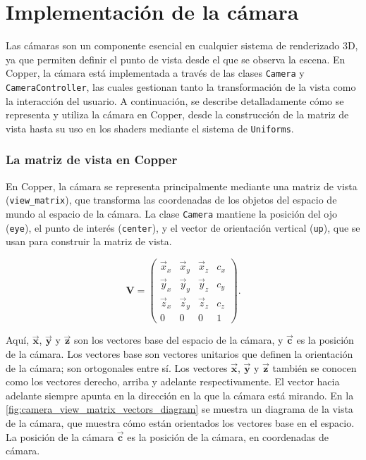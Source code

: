 \chapter{Implementación de la cámara}

Las cámaras son un componente esencial en cualquier sistema de renderizado 3D,
ya que permiten definir el punto de vista desde el que se observa la escena. En
Copper, la cámara está implementada a través de las clases \texttt{Camera} y
\texttt{CameraController}, las cuales gestionan tanto la transformación de la
vista como la interacción del usuario. A continuación, se describe
detalladamente cómo se representa y utiliza la cámara en Copper, desde la
construcción de la matriz de vista hasta su uso en los shaders mediante el
sistema de \texttt{Uniforms}.

\subsection{La matriz de vista en Copper}

En Copper, la cámara se representa principalmente mediante una matriz de vista
(\texttt{view\_matrix}), que transforma las coordenadas de los objetos del
espacio de mundo al espacio de la cámara. La clase \texttt{Camera} mantiene la
posición del ojo (\texttt{eye}), el punto de interés (\texttt{center}), y el
vector de orientación vertical (\texttt{up}), que se usan para construir la
matriz de vista.

\begin{equation}
    \bm{V}
    =
    \begin{pmatrix}
        \vec{x}_x & \vec{x}_y & \vec{x}_z & c_x
        \\
        \vec{y}_x & \vec{y}_y & \vec{y}_z & c_y
        \\
        \vec{z}_x & \vec{z}_y & \vec{z}_z & c_z
        \\
        0         & 0         & 0         & 1
    \end{pmatrix}.
\end{equation}

Aquí, $\vec{\bm{x}}$, $\vec{\bm{y}}$ y $\vec{\bm{z}}$ son los vectores base del
espacio de la cámara, y $\vec{\bm{c}}$ es la posición de la cámara. Los
vectores base son vectores unitarios que definen la orientación de la cámara;
son ortogonales entre sí. Los vectores $\vec{\bm{x}}$, $\vec{\bm{y}}$ y
$\vec{\bm{z}}$ también se conocen como los vectores derecho, arriba y adelante
respectivamente. El vector hacia adelante siempre apunta en la dirección en la
que la cámara está mirando. En la \ref{fig:camera_view_matrix_vectors_diagram}
se muestra un diagrama de la vista de la cámara, que muestra cómo están
orientados los vectores base en el espacio. La posición de la cámara
$\vec{\bm{c}}$ es la posición de la cámara, en coordenadas de cámara.

